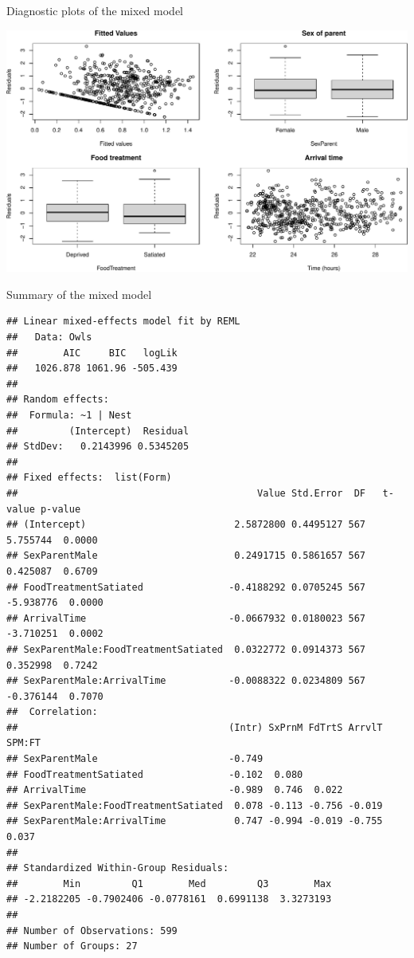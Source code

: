 \documentclass[
  ignorenonframetext,
]{beamer}
\begin{document}
\begin{frame}{Diagnostic plots of the mixed model}
\protect\hypertarget{diagnostic-plots-of-the-mixed-model}{}

\scriptsize

\includegraphics{mixed_models_files/figure-beamer/unnamed-chunk-14-1.pdf}

\end{frame}

\begin{frame}[fragile]{Summary of the mixed model}
\protect\hypertarget{summary-of-the-mixed-model}{}

\tiny

\begin{verbatim}
## Linear mixed-effects model fit by REML
##   Data: Owls 
##        AIC     BIC   logLik
##   1026.878 1061.96 -505.439
## 
## Random effects:
##  Formula: ~1 | Nest
##         (Intercept)  Residual
## StdDev:   0.2143996 0.5345205
## 
## Fixed effects:  list(Form) 
##                                          Value Std.Error  DF   t-value p-value
## (Intercept)                          2.5872800 0.4495127 567  5.755744  0.0000
## SexParentMale                        0.2491715 0.5861657 567  0.425087  0.6709
## FoodTreatmentSatiated               -0.4188292 0.0705245 567 -5.938776  0.0000
## ArrivalTime                         -0.0667932 0.0180023 567 -3.710251  0.0002
## SexParentMale:FoodTreatmentSatiated  0.0322772 0.0914373 567  0.352998  0.7242
## SexParentMale:ArrivalTime           -0.0088322 0.0234809 567 -0.376144  0.7070
##  Correlation: 
##                                     (Intr) SxPrnM FdTrtS ArrvlT SPM:FT
## SexParentMale                       -0.749                            
## FoodTreatmentSatiated               -0.102  0.080                     
## ArrivalTime                         -0.989  0.746  0.022              
## SexParentMale:FoodTreatmentSatiated  0.078 -0.113 -0.756 -0.019       
## SexParentMale:ArrivalTime            0.747 -0.994 -0.019 -0.755  0.037
## 
## Standardized Within-Group Residuals:
##        Min         Q1        Med         Q3        Max 
## -2.2182205 -0.7902406 -0.0778161  0.6991138  3.3273193 
## 
## Number of Observations: 599
## Number of Groups: 27
\end{verbatim}

\end{frame}
\end{document}
